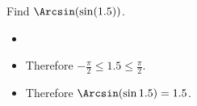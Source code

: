 \begin{frame}
\begin{example}
Find $\Arcsin (\sin (1.5))$.
\begin{itemize}
\item<2->  
\item<4->  Therefore $-\frac{\pi}{2} \leq 1.5\leq \frac{\pi}{2}$.
\item<5->  Therefore $\Arcsin (\sin 1.5) = 1.5$.
\end{itemize}
\end{example}
\end{frame}
